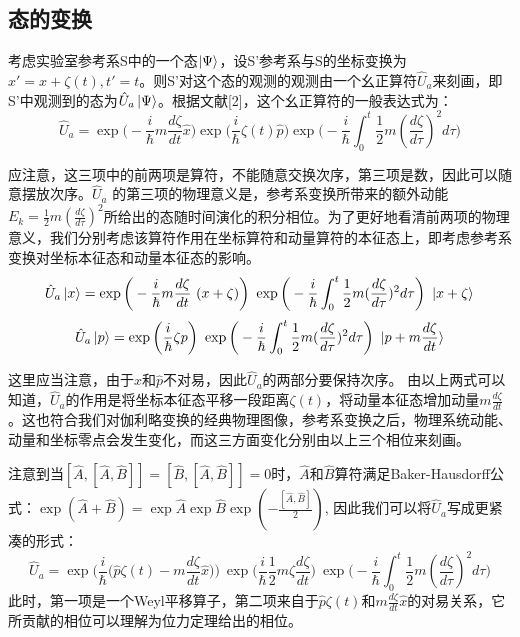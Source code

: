 \documentclass[a4paper]{article}
\begin{document}
        \subsection{态的变换}
        
        考虑实验室参考系S中的一个态$\ket{\Psi}$，设S’参考系与S的坐标变换为$x'=x+\zeta(t), t'=t$。则S’对这个态的观测的观测由一个幺正算符$\hat{U}_a$来刻画，即S’中观测到的态为$\hat{U}_a\ket{\Psi}$。根据文献[2]，这个幺正算符的一般表达式为：
        \begin{equation}
            \hat{U}_a=\exp\bigg(-\frac{i}{\hbar} m \frac{d \zeta}{dt} \hat{x}\bigg) \exp\bigg({\frac{i}{\hbar}\zeta(t) \hat{p}}\bigg) \exp\bigg(-\frac{i}{\hbar}\int_0^t\frac{1}{2}m(\frac{d \zeta}{d\tau})^2 d\tau\bigg)
        \end{equation}
        
        应注意，这三项中的前两项是算符，不能随意交换次序，第三项是数，因此可以随意摆放次序。$\hat{U}_a$ 的第三项的物理意义是，参考系变换所带来的额外动能$E_k=\frac{1}{2}m(\frac{d \zeta}{d\tau})^2$所给出的态随时间演化的积分相位。为了更好地看清前两项的物理意义，我们分别考虑该算符作用在坐标算符和动量算符的本征态上，即考虑参考系变换对坐标本征态和动量本征态的影响。
        \begin{equation}
            \hat{U}_a \ket{x} = \exp\bigg(-\frac{i}{\hbar}m\frac{d \zeta}{dt}\ (x+\zeta)\bigg)\ \exp\bigg(-\frac{i}{\hbar}\int_0^t\frac{1}{2}m(\frac{d \zeta}{d\tau})^2 d\tau \bigg)\ \ket{x+\zeta}
        \end{equation}
        \begin{equation}
            \hat{U}_a \ket{p} = \exp\bigg(\frac{i}{\hbar}\zeta p \bigg)\ \exp\bigg(-\frac{i}{\hbar}\int_0^t\frac{1}{2}m(\frac{d \zeta}{d\tau})^2 d\tau \bigg)\ \ket{p+m\frac{d \zeta}{dt}}
        \end{equation}

        这里应当注意，由于$\hat{x}$和$\hat{p}$不对易，因此$\hat{U}_a$的两部分要保持次序。
        由以上两式可以知道，$\hat{U}_a$的作用是将坐标本征态平移一段距离$\zeta(t)$，将动量本征态增加动量$m\frac{d \zeta}{dt}$。这也符合我们对伽利略变换的经典物理图像，参考系变换之后，物理系统动能、动量和坐标零点会发生变化，而这三方面变化分别由以上三个相位来刻画。

        注意到当$[\hat{A}, [\hat{A}, \hat{B}]]=[\hat{B}, [\hat{A}, \hat{B}]]=0$时，$\hat{A}$和$\hat{B}$算符满足Baker-Hausdorff公式：$\exp(\hat{A}+\hat{B})=\exp\hat{A} \exp\hat{B} \exp(-\frac{[\hat{A}, \hat{B}]}{2})$, 因此我们可以将$\hat{U}_a$写成更紧凑的形式：
        \begin{equation}
            \hat{U}_a=\exp\bigg(\frac{i}{\hbar}\bigg(\hat{p}\zeta(t)-m\frac{d\zeta}{dt}\hat{x} \bigg) \bigg)\ \exp\bigg(\frac{i}{\hbar}\frac{1}{2}m\zeta\frac{d\zeta}{dt} \bigg)\ \exp\bigg(-\frac{i}{\hbar}\int_0^t\frac{1}{2}m(\frac{d \zeta}{d\tau})^2 d\tau \bigg)
        \end{equation}
        此时，第一项是一个Weyl平移算子，第二项来自于$\hat{p}\zeta(t)$和$m\frac{d\zeta}{dt}\hat{x}$的对易关系，它所贡献的相位可以理解为位力定理给出的相位。
        
\end{document}
